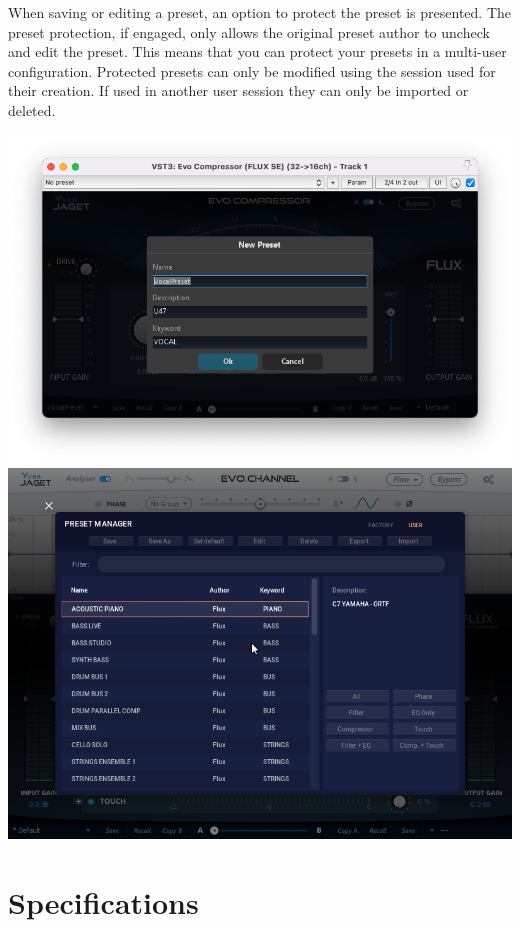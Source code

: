 \documentclass[
  letterpaper,
  DIV=11,
  numbers=noendperiod]{scrreport}
\begin{document}
When saving or editing a preset, an option to protect the preset is
presented. The preset protection, if engaged, only allows the original
preset author to uncheck and edit the preset. This means that you can
protect your presets in a multi-user configuration. Protected presets
can only be modified using the session used for their creation. If used
in another user session they can only be imported or deleted.

\includegraphics{./include/evoComp_preset2.png}
\includegraphics{./include/ManualEvoChannel-014.png}


\hypertarget{specifications}{%
\chapter{Specifications}\label{specifications}}
\end{document}
